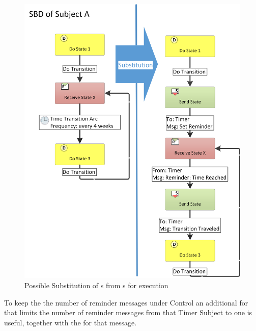 \begin{figure}[hp]
	\centering
	\includegraphics[width=1.0\linewidth]{Figures/Ontology/ReminderTransitionReceiveStateInterpretationSBD.png}
	\caption[Possible Substitution of s from s for execution]{Possible Substitution of s from s for execution}
	\label{fig:reminderReceiveSubstitution}
\end{figure}

To keep the the number of reminder messages under Control an additional  for that limits the number of reminder messages from that Timer Subject to one is useful, together with the  for that message.





